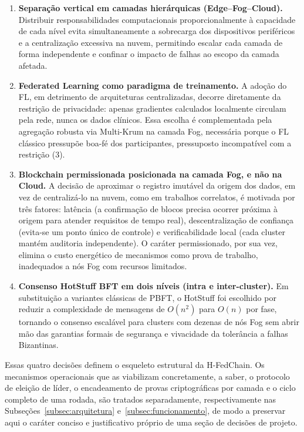 \documentclass[12pt]{article}
\begin{document}
\begin{enumerate}
    \item \textbf{Separação vertical em camadas hierárquicas (Edge–Fog–Cloud).} Distribuir responsabilidades computacionais proporcionalmente à capacidade de cada nível evita simultaneamente a sobrecarga dos dispositivos periféricos e a centralização excessiva na nuvem, permitindo escalar cada camada de forma independente e confinar o impacto de falhas ao escopo da camada afetada.

    \item \textbf{Federated Learning como paradigma de treinamento.} A adoção do FL, em detrimento de arquiteturas centralizadas, decorre diretamente da restrição de privacidade: apenas gradientes calculados localmente circulam pela rede, nunca os dados clínicos. Essa escolha é complementada pela agregação robusta via Multi-Krum na camada Fog, necessária porque o FL clássico pressupõe boa-fé dos participantes, pressuposto incompatível com a restrição (3).

    \item \textbf{Blockchain permissionada posicionada na camada Fog, e não na Cloud.} A decisão de aproximar o registro imutável da origem dos dados, em vez de centralizá-lo na nuvem, como em trabalhos correlatos, é motivada por três fatores: latência (a confirmação de blocos precisa ocorrer próxima à origem para atender requisitos de tempo real), descentralização de confiança (evita-se um ponto único de controle) e verificabilidade local (cada cluster mantém auditoria independente). O caráter permissionado, por sua vez, elimina o custo energético de mecanismos como prova de trabalho, inadequados a nós Fog com recursos limitados.

    \item \textbf{Consenso HotStuff BFT em dois níveis (intra e inter-cluster).} Em substituição a variantes clássicas de PBFT, o HotStuff foi escolhido por reduzir a complexidade de mensagens de $O(n^2)$ para $O(n)$ por fase, tornando o consenso escalável para clusters com dezenas de nós Fog sem abrir mão das garantias formais de segurança e vivacidade da tolerância a falhas Bizantinas.
\end{enumerate}

Essas quatro decisões definem o esqueleto estrutural da H-FedChain. Os mecanismos operacionais que as viabilizam concretamente, a saber, o protocolo de eleição de líder, o encadeamento de provas criptográficas por camada e o ciclo completo de uma rodada, são tratados separadamente, respectivamente nas Subseções~\ref{subsec:arquitetura} e~\ref{subsec:funcionamento}, de modo a preservar aqui o caráter conciso e justificativo próprio de uma seção de decisões de projeto.
\end{document}
